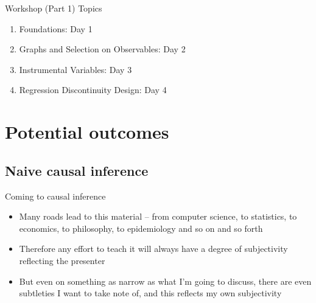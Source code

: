 \documentclass{beamer}
\begin{document}




%


\begin{frame}{Workshop (Part 1) Topics}

  \begin{enumerate}
    \item Foundations: Day 1
    \item Graphs and Selection on Observables: Day 2
    \item Instrumental Variables: Day 3
    \item Regression Discontinuity Design: Day 4
  \end{enumerate}

\end{frame}



\section{Potential outcomes}



\subsection{Naive causal inference}


\begin{frame}{Coming to causal inference}

\begin{itemize}
\item Many roads lead to this material -- from computer science, to statistics, to economics, to philosophy, to epidemiology and so on and so forth
\item Therefore any effort to teach it will always have a degree of subjectivity reflecting the presenter
\item But even on something as narrow as what I'm going to discuss, there are even subtleties I want to take note of, and this reflects my own subjectivity

\end{itemize}

\end{frame}
\end{document}
